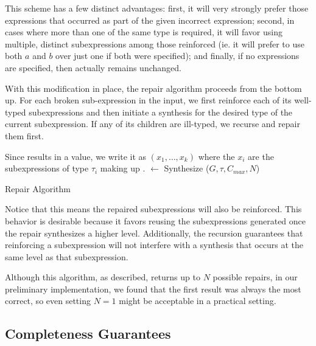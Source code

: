 This scheme has a few distinct advantages: first, it will very
strongly prefer those expressions that occurred as part of the given
incorrect expression; second, in cases where more than one of the same
type is required, it will favor using multiple, distinct
subexpressions among those reinforced (ie. it will prefer to use both
$a$ and $b$ over just one if both were specified); and finally, if no
expressions are specified, then \Cost actually remains unchanged.

With this modification in place, the repair algorithm proceeds from
the bottom up. For each broken sub-expression in the input, we first
reinforce each of its well-typed subexpressions and then initiate a
synthesis for the desired type of the current subexpression. If any of
its children are ill-typed, we recurse and repair them first.
\begin{algorithm}
\Output{\Repairs}
\BlankLine
{}
Since \Expr results in a value, we write it as \Expr$(x_1, \ldots, x_k)$ where the $x_i$ are the subexpressions of type $\tau_i$ making up \Expr.
\Repairs $\longleftarrow$ Synthesize ($G, \tau, C_{max}, N$)
\caption{Repair Algorithm}\label{proc:repair}
\end{algorithm}
Notice that this means the repaired subexpressions will also be
reinforced. This behavior is desirable because it favors reusing the
subexpressions generated once the repair synthesizes a higher
level. Additionally, the recursion guarantees that reinforcing a
subexpression will not interfere with a synthesis that occurs at the
same level as that subexpression.

Although this algorithm, as described, returns up to $N$ possible
repairs, in our preliminary implementation, we found that the first
result was always the most correct, so even setting $N=1$ might be
acceptable in a practical setting.

\iffalse

\subsection{Completeness Guarantees}

